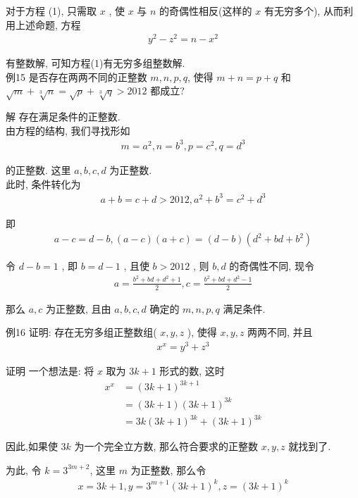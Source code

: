 	对于方程 (1), 只需取 $x$ , 使 $x$ 与 $n$ 的奇偶性相反(这样的 $x$ 有无穷多个), 从而利用上述命题, 方程
\begin{align*}
		y^{2}-z^{2}=n-x^{2}
	\end{align*}

	有整数解, 可知方程(1)有无穷多组整数解. \\
	例15 是否存在两两不同的正整数 $m ,  n ,  p ,  q$, 使得 $m+n=p+q$ 和 $\sqrt{m}+\sqrt[3]{n}=\sqrt{p}+\sqrt[3]{q}>2012$ 都成立?

	解 存在满足条件的正整数. \\
	由方程的结构, 我们寻找形如
\begin{align*}
		m=a^{2}, n=b^{3}, p=c^{2}, q=d^{3}
	\end{align*}

	的正整数. 这里 $a ,  b ,  c ,  d$ 为正整数. \\
	此时, 条件转化为
\begin{align*}
		a+b=c+d>2012, a^{2}+b^{3}=c^{2}+d^{3}
	\end{align*}

	即
\begin{align*}
		a-c=d-b,(a-c)(a+c)=(d-b)\left(d^{2}+b d+b^{2}\right)
	\end{align*}

	令 $d-b=1$ , 即 $b=d-1$ , 且使 $b>2012$ , 则 $b ,  d$ 的奇偶性不同, 现令
\begin{align*}
		a=\frac{b^{2}+b d+d^{2}+1}{2}, c=\frac{b^{2}+b d+d^{2}-1}{2}
	\end{align*}

	那么 $a ,  c$ 为正整数, 且由 $a ,  b ,  c ,  d$ 确定的 $m ,  n ,  p ,  q$ 满足条件.

	例16 证明: 存在无穷多组正整数组( $x, y, z$ ), 使得 $x, y, z$ 两两不同, 并且
\begin{align*}
		x^{x}=y^{3}+z^{3}
	\end{align*}

	证明 一个想法是: 将 $x$ 取为 $3 k+1$ 形式的数, 这时\begin{align}
		x^{x} & =(3 k+1)^{3 k+1}                \\
		      & =(3 k+1)(3 k+1)^{3 k}           \\
		      & =3 k(3 k+1)^{3 k}+(3 k+1)^{3 k}
	\end{align}

	因此,如果使 $3 k$ 为一个完全立方数, 那么符合要求的正整数 $x ,  y ,  z$ 就找到了.

	为此, 令 $k=3^{3 m+2}$, 这里 $m$ 为正整数, 那么令
\begin{align*}
		x=3 k+1, y=3^{m+1}(3 k+1)^{k}, z=(3 k+1)^{k}
	\end{align*}

